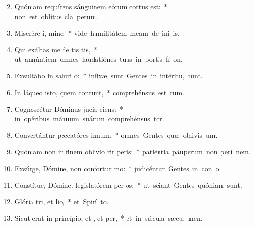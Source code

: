 \begin{flushleft}
\begin{enumerate}[leftmargin=*]
\setcounter{enumi}{1}

\item Quóniam requírens sánguinem eórum cortus est:~* \mbox{non est oblítus cla perum.}

\item Miserére i, mine:~* \mbox{vide humilitátem meam de ini is.}

\item Qui exáltas me de tis tis,~* \mbox{ut annúntiem omnes laudatiónes tuas in portis fí on.}

\item Exsultábo in saluri o:~* \mbox{infíxæ sunt Gentes in intéritu,  runt.}

\item In láqueo isto, quem conrunt,~* \mbox{comprehénsus est  rum.}

\item Cognoscétur Dóminus jucia ciens:~* \mbox{in opéribus mánuum suárum comprehénsus  tor.}

\item Convertántur peccatóres  innum,~* \mbox{omnes Gentes quæ oblivis um.}

\item Quóniam non in finem oblívio rit peris:~* \mbox{patiéntia páuperum non perí  nem.}

\item Exsúrge, Dómine, non confortur mo:~* \mbox{judicéntur Gentes in con o.}

\item Constítue, Dómine, legislatórem per os:~* \mbox{ut sciant Gentes quóniam  sunt.}

\item Glória tri, et lio,~* \mbox{et Spirí to.}

\item Sicut erat in princípio, et , et per,~* \mbox{et in s\'{\ae}cula sæcu. men.}


\end{enumerate}
\end{flushleft}

